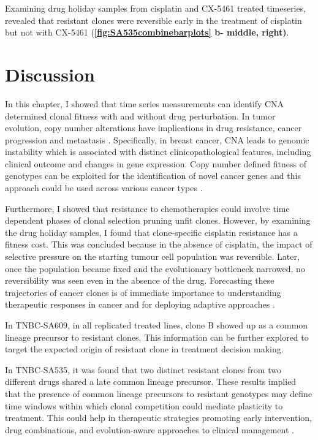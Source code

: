 Examining drug holiday samples from cisplatin and CX-5461 treated timeseries, revealed that resistant clones were reversible early in the treatment of cisplatin but not with CX-5461 (\textbf{\autoref{fig:SA535combinebarplots} b- middle, right)}.


\section{Discussion}

 In this chapter, I showed that time series measurements can identify CNA determined clonal fitness with and without drug perturbation. In tumor evolution, copy number alterations have implications in drug resistance, cancer progression and metastasis \cite{ bielski2018genome, beroukhim2010landscape}. Specifically, in breast cancer, CNA leads to genomic instability which is associated with distinct clinicopathological features, including clinical outcome and changes in gene expression. Copy number defined fitness of genotypes can be exploited for the identification of novel cancer genes and this approach could be used across various cancer types \cite{ lopez2020interplay}.


 Furthermore, I showed that resistance to chemotherapies could involve time dependent phases of clonal selection pruning unfit clones. However, by examining the drug holiday samples, I found that clone-specific cisplatin resistance has a fitness cost. This was concluded because in the absence of cisplatin, the impact of  selective pressure on the starting tumour cell population was reversible. Later, once the population became fixed and the evolutionary bottleneck narrowed, no reversibility was seen even in the absence of the drug. Forecasting these trajectories of cancer clones is of immediate importance to understanding therapeutic responses in cancer and for deploying adaptive approaches \cite{Vasan2019-mt}. 


 In TNBC-SA609, in all replicated treated lines,  clone B showed up as a common lineage precursor to resistant clones.  This information can be further explored to target the expected origin of resistant clone in treatment decision making.

 In TNBC-SA535, it was found that two distinct resistant clones from two different drugs shared a late common lineage precursor. These results implied that the presence of common lineage precursors to resistant genotypes may define time windows within which clonal competition could mediate plasticity to treatment. This could help in therapeutic strategies promoting early intervention, drug combinations, and evolution-aware approaches to clinical management \cite{Acar2020-tf}.



